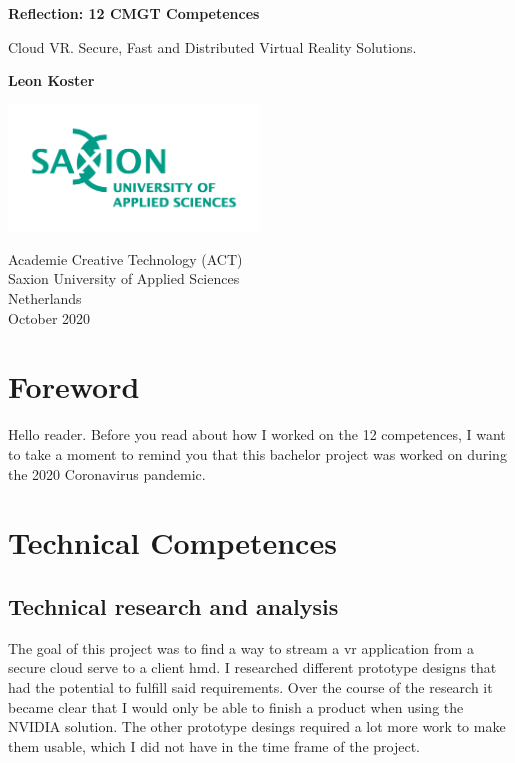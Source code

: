 \documentclass[]{article}
\begin{document}
\begin{titlepage}
   \begin{center}
       \vspace*{1cm}

       \textbf{Reflection: 12 CMGT Competences}

       \vspace{0.5cm}
       Cloud VR. Secure, Fast and Distributed Virtual Reality Solutions.
       \vspace{1.5cm}

       \textbf{Leon Koster}

       \vfill
            
       \vspace{0.8cm}
     
      \includegraphics[width=0.5\textwidth]{university}
            
       Academie Creative Technology (ACT)\\
       Saxion University of Applied Sciences\\
       Netherlands\\
       October 2020
            
   \end{center}
\end{titlepage}

\tableofcontents
\printnoidxglossary[type=\acronymtype]
\newpage

\section{Foreword}
Hello reader. Before you read about how I worked on the 12 competences, I want to take a moment to remind you that this bachelor project was worked on during the 2020 Coronavirus pandemic. 

\section{Technical Competences}
\subsection{Technical research and analysis}
The goal of this project was to find a way to stream a \acrshort{vr}  application from a secure cloud serve to a client \acrshort{hmd}. I researched different prototype designs that had the potential to fulfill said requirements. Over the course of the research it became clear that I would only be able to finish a product when using the NVIDIA solution. The other prototype desings required a lot more work to make them usable, which I did not have in the time frame of the project. 
\end{document}
